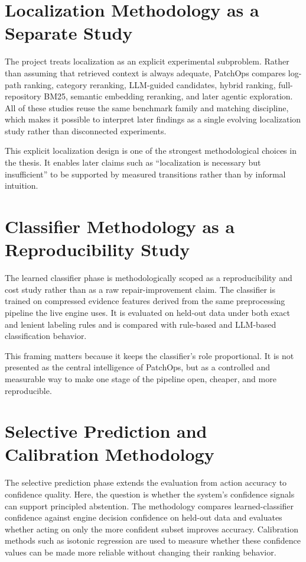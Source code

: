 \section{Localization Methodology as a Separate Study}

The project treats localization as an explicit experimental subproblem. Rather than assuming that retrieved
context is always adequate, PatchOps compares log-path ranking, category reranking, LLM-guided candidates,
hybrid ranking, full-repository BM25, semantic embedding reranking, and later agentic exploration. All of these
studies reuse the same benchmark family and matching discipline, which makes it possible to interpret later
findings as a single evolving localization study rather than disconnected experiments.

This explicit localization design is one of the strongest methodological choices in the thesis. It enables later
claims such as ``localization is necessary but insufficient'' to be supported by measured transitions rather than
by informal intuition.

\section{Classifier Methodology as a Reproducibility Study}

The learned classifier phase is methodologically scoped as a reproducibility and cost study rather than as a raw
repair-improvement claim. The classifier is trained on compressed evidence features derived from the same
preprocessing pipeline the live engine uses. It is evaluated on held-out data under both exact and lenient
labeling rules and is compared with rule-based and LLM-based classification behavior.

This framing matters because it keeps the classifier's role proportional. It is not presented as the central
intelligence of PatchOps, but as a controlled and measurable way to make one stage of the pipeline open,
cheaper, and more reproducible.

\section{Selective Prediction and Calibration Methodology}

The selective prediction phase extends the evaluation from action accuracy to confidence quality. Here, the
question is whether the system's confidence signals can support principled abstention. The methodology compares
learned-classifier confidence against engine decision confidence on held-out data and evaluates whether acting on
only the more confident subset improves accuracy. Calibration methods such as isotonic regression are used to
measure whether these confidence values can be made more reliable without changing their ranking behavior.


